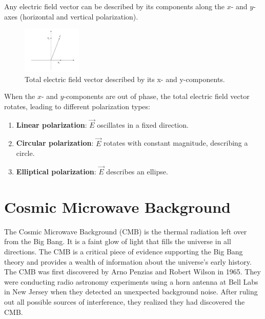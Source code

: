 Any electric field vector can be described by its components along the \(x\)- and \(y\)-axes (horizontal and vertical polarization).

\begin{figure}[H]
    \centering
    \includegraphics[width=0.25\textwidth]{Images/polarization_components.png}
    \caption{Total electric field vector described by its x- and y-components.}
    \label{fig:polarization_components}
\end{figure}

When the \(x\)- and \(y\)-components are out of phase, the total electric field vector rotates, leading to different polarization types:
\begin{enumerate}
	\item \textbf{Linear polarization}: \(\vec{E}\) oscillates in a fixed direction.
	\item \textbf{Circular polarization}: \(\vec{E}\) rotates with constant magnitude, describing a circle.
	\item \textbf{Elliptical polarization}: \(\vec{E}\) describes an ellipse.
\end{enumerate}

\clearpage

\section{Cosmic Microwave Background}

The Cosmic Microwave Background (CMB) is the thermal radiation left over from the Big Bang. It is a faint glow of light that fills the universe in all directions. The CMB is a critical piece of evidence supporting the Big Bang theory and provides a wealth of information about the universe's early history. \\

The CMB was first discovered by Arno Penzias and Robert Wilson in 1965. They were conducting radio astronomy experiments using a horn antenna at Bell Labs in New Jersey when they detected an unexpected background noise. After ruling out all possible sources of interference, they realized they had discovered the CMB. \\

